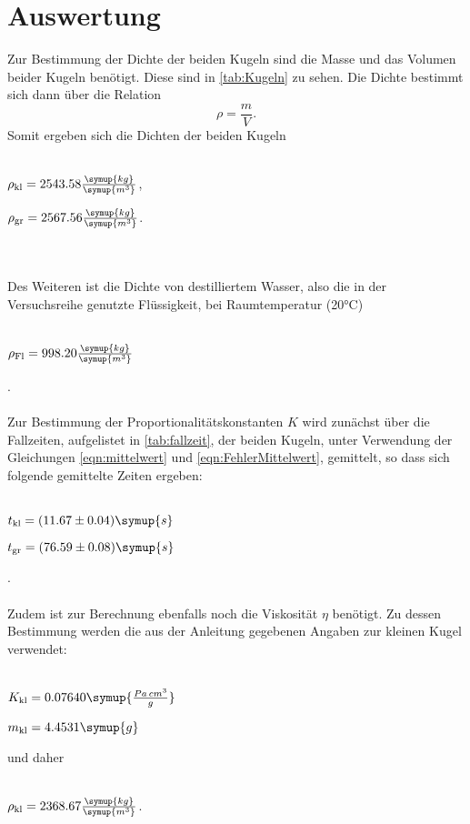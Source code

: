 \section{Auswertung}
\label{sec:Auswertung}
Zur Bestimmung der Dichte der beiden Kugeln sind die Masse und das Volumen beider Kugeln benötigt. Diese sind in \autoref{tab:Kugeln}
zu sehen. Die Dichte bestimmt sich dann über die Relation
\begin{equation}
\rho = \frac{m}{V}.
\end{equation}
Somit ergeben sich die Dichten der beiden Kugeln
\\ \\
\centerline{$\rho_\text{kl} = 2543.58 \frac{\symup{kg}}{\symup{m^3}}$,}
\centerline{$\rho_\text{gr} = 2567.56 \frac{\symup{kg}}{\symup{m^3}}$.}
\\ \\

Des Weiteren ist die Dichte von destilliertem Wasser, also die in der Versuchsreihe genutzte Flüssigkeit, bei Raumtemperatur (20°C) \cite{science}
\\ \\
\centerline{$\rho_\text{Fl} = 998.20 \frac{\symup{kg}}{\symup{m^3}}$}.
\\ \\

Zur Bestimmung der Proportionalitätskonstanten $K$ wird zunächst über die Fallzeiten, aufgelistet in \autoref{tab:fallzeit}, der beiden Kugeln, unter Verwendung der Gleichungen \eqref{eqn:mittelwert} und \eqref{eqn:FehlerMittelwert},
gemittelt, so dass  sich folgende gemittelte Zeiten ergeben:
\\ \\
\centerline{$t_\text{kl} = (11.67 \pm 0.04) \symup{s}$}

\centerline{$t_\text{gr} = (76.59 \pm 0.08) \symup{s}$}.
\\ \\

Zudem ist zur Berechnung ebenfalls noch die Viskosität $\eta$ benötigt. Zu dessen Bestimmung werden die aus der Anleitung \cite{V207} gegebenen Angaben zur kleinen Kugel verwendet:
\\ \\
\centerline{$K_\text{kl} = 0.07640 \symup{\frac{Pa \, cm^3}{g}}$}
\centerline{$m_\text{kl} = 4.4531 \symup{g}$}
und daher
\\ \\
\centerline{$\rho_\text{kl} = 2368.67 \frac{\symup{kg}}{\symup{m^3}}$.}
\\ \\

